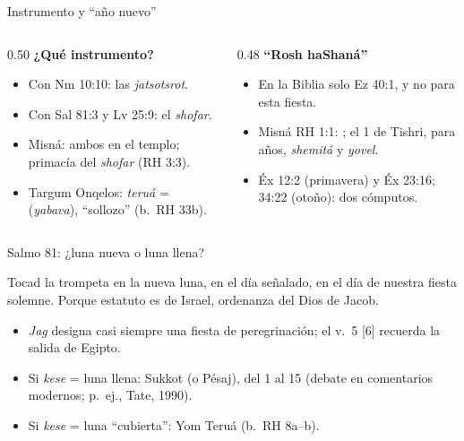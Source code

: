 \begin{frame}{Instrumento y ``año nuevo''}
\begin{columns}[t,onlytextwidth]
\begin{column}{0.50\textwidth}\small\RaggedRight
\textbf{\textcolor{tierraroja}{¿Qué instrumento?}}
\begin{itemize}
\item Con Nm 10:10: las \emph{jatsotsrot}.
\item Con Sal 81:3 y Lv 25:9: el \emph{shofar}.
\item Misná: ambos en el templo; primacía del \emph{shofar} (RH 3:3).
\item Targum Onqelos: \emph{teruá} =  (\emph{yabava}), ``sollozo'' (b.~RH 33b).
\end{itemize}
\end{column}
\begin{column}{0.48\textwidth}\small\RaggedRight
\textbf{\textcolor{tierraroja}{``Rosh haShaná''}}
\begin{itemize}
\item En la Biblia solo Ez 40:1, y no para esta fiesta.
\item Misná RH 1:1: ; el 1 de Tishri, para años, \emph{shemitá} y \emph{yovel}.
\item Éx 12:2 (primavera) y Éx 23:16; 34:22 (otoño): dos cómputos.
\end{itemize}
\end{column}
\end{columns}\par\medskip
{}
\end{frame}

\begin{frame}{Salmo 81: ¿luna nueva o luna llena?}
\begin{center}\end{center}
\begin{cita}Tocad la trompeta en la nueva luna, en el día señalado, en el día de nuestra fiesta solemne. Porque estatuto es de Israel, ordenanza del Dios de Jacob.\end{cita}
\small\RaggedRight
\begin{itemize}
\item \emph{Jag} designa casi siempre una fiesta de peregrinación; el v.~5 [6] recuerda la salida de Egipto.
\item Si \emph{kese} = luna llena: Sukkot (o Pésaj), del 1 al 15 (debate en comentarios modernos; p.~ej., Tate, 1990).
\item Si \emph{kese} = luna ``cubierta'': Yom Teruá (b.~RH 8a--b).
\end{itemize}
\end{frame}

